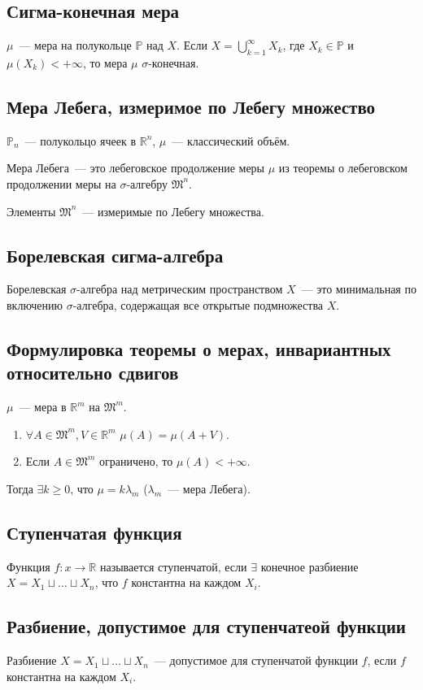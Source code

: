 \documentclass[paper=a4, fontsize=11pt]{article}
\begin{document}
\subsection{Сигма-конечная мера}
$\mu$~--- мера на полукольце $\mathds{P}$ над $X$. Если $X = \bigcup_{k=1}^\infty X_k$, где $X_k \in \mathds{P}$
и $\mu(X_k) < +\infty$, то мера $\mu$ $\sigma$-конечная.

\subsection{Мера Лебега, измеримое по Лебегу множество}
$\mathds{P}_n$~--- полукольцо ячеек в $\mathds{R}^n$, $\mu$~--- классический объём.

Мера Лебега~--- это лебеговское продолжение меры $\mu$ из теоремы о лебеговском продолжении меры на $\sigma$-алгебру $\mathfrak{M}^n$.

Элементы $\mathfrak{M}^n$~--- измеримые по Лебегу множества.

\subsection{Борелевская сигма-алгебра}
Борелевская $\sigma$-алгебра над метрическим пространством $X$~--- это минимальная по включению $\sigma$-алгебра, содержащая все
открытые подмножества $X$.

\subsection{Формулировка теоремы о мерах, инвариантных относительно сдвигов}
$\mu$~--- мера в $\mathds{R}^m$ на $\mathfrak{M}^m$.
\begin{enumerate}
    \item $\forall A \in \mathfrak{M}^m,V \in \mathds{R}^m$ $\mu(A) = \mu(A+V)$.
    \item Если $A \in \mathfrak{M}^m$ ограничено, то $\mu(A) < +\infty$.
\end{enumerate}
Тогда $\exists k \geq 0$, что $\mu = k \lambda_m$ ($\lambda_m$~--- мера Лебега).

\subsection{Ступенчатая функция}
Функция $f:x \rightarrow \mathds{R}$ называется ступенчатой, если $\exists$ конечное разбиение
$X = X_1 \sqcup \dots \sqcup X_n$, что $f$ константна на каждом $X_i$.

\subsection{Разбиение, допустимое для ступенчатеой функции}
Разбиение $X = X_1 \sqcup \dots \sqcup X_n$~--- допустимое для ступенчатой функции $f$,
если $f$ константна на каждом $X_i$.
\end{document}
